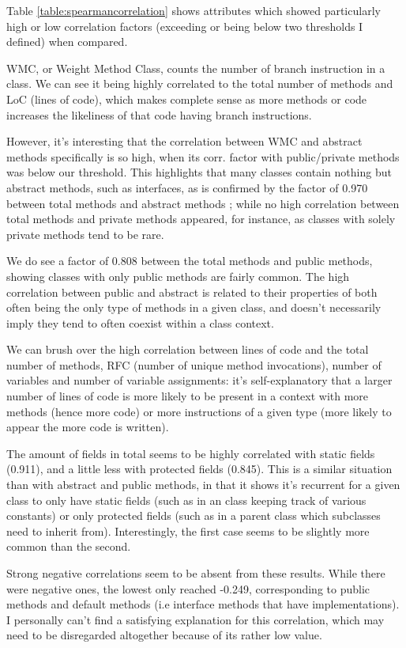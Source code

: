 \documentclass[12pt]{article}
\begin{document}
Table \ref{table:spearmancorrelation} shows attributes which showed particularly high or low correlation factors (exceeding or being below two thresholds I defined) when compared. 

\bigskip
WMC, or Weight Method Class, counts the number of branch instruction in a class. We can see it being highly correlated to the total number of methods and LoC (lines of code), which makes complete sense as more methods or code increases the likeliness of that code having branch instructions. 

However, it's interesting that the correlation between WMC and abstract methods specifically is so high, when its corr. factor with public/private methods was below our threshold. This highlights that many classes contain nothing but abstract methods, such as interfaces, as is confirmed by the factor of 0.970 between total methods and abstract methods ; while no high correlation between total methods and private methods appeared, for instance, as classes with solely private methods tend to be rare. 

We do see a factor of 0.808 between the total methods and public methods, showing classes with only public methods are fairly common. The high correlation between public and abstract is related to their properties of both often being the only type of methods in a given class, and doesn't necessarily imply they tend to often coexist within a class context.

\bigskip
We can brush over the high correlation between lines of code and the total number of methods, RFC (number of unique method invocations), number of variables and number of variable assignments: it's self-explanatory that a larger number of lines of code is more likely to be present in a context with more methods (hence more code) or more instructions of a given type (more likely to appear the more code is written).

\bigskip
The amount of fields in total seems to be highly correlated with static fields (0.911), and a little less with protected fields (0.845). This is a similar situation than with abstract and public methods, in that it shows it's recurrent for a given class to only have static fields (such as in an class keeping track of various constants) or only protected fields (such as in a parent class which subclasses need to inherit from). Interestingly, the first case seems to be slightly more common than the second.

\bigskip
Strong negative correlations seem to be absent from these results. While there were negative ones, the lowest only reached -0.249, corresponding to public methods and default methods (i.e interface methods that have implementations). I personally can't find a satisfying explanation for this correlation, which may need to be disregarded altogether because of its rather low value.
\end{document}
